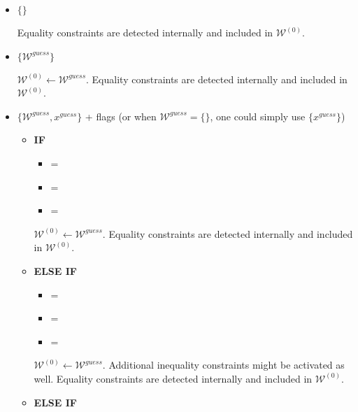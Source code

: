 \documentclass[12pt,a4paper]{article}
\begin{document}
\begin{itemize}
\item {\color{blue}$\{\}$}

  Equality constraints are detected internally and included in $\mathcal{W}^{(0)}$.

\item {\color{blue}$\{\mathcal{W}^{\mathit{guess}}\}$}

  $\mathcal{W}^{(0)} \leftarrow \mathcal{W}^{\mathit{guess}}$. Equality constraints are detected
  internally and included in $\mathcal{W}^{(0)}$. 

\item {\color{blue}$\{\mathcal{W}^{\mathit{guess}}, x^{\mathit{guess}}\}$} + flags (or when
  $\mathcal{W}^{\mathit{guess}} = \{\}$, one could simply use {\color{blue}$\{x^{\mathit{guess}}\}$})

  \begin{itemize}
  \item[\ding{237}] {\bf IF}
    
    \begin{itemize}
    \item {} = 
    \item {} =  
    \item {} = 
    \end{itemize}
    $\mathcal{W}^{(0)} \leftarrow \mathcal{W}^{\mathit{guess}}$. Equality constraints are detected
    internally and included in $\mathcal{W}^{(0)}$. 

  \item[\ding{237}] {\bf ELSE IF}

    \begin{itemize}
    \item {} = 
    \item {\color{blue} = }
    \item {} = 
    \end{itemize}
    $\mathcal{W}^{(0)} \leftarrow \mathcal{W}^{\mathit{guess}}$. Additional inequality constraints
    might be activated as well. Equality constraints are detected internally and included in
    $\mathcal{W}^{(0)}$.

  \item[\ding{237}] {\bf ELSE IF}


\end{itemize}
\end{itemize}
\end{document}
